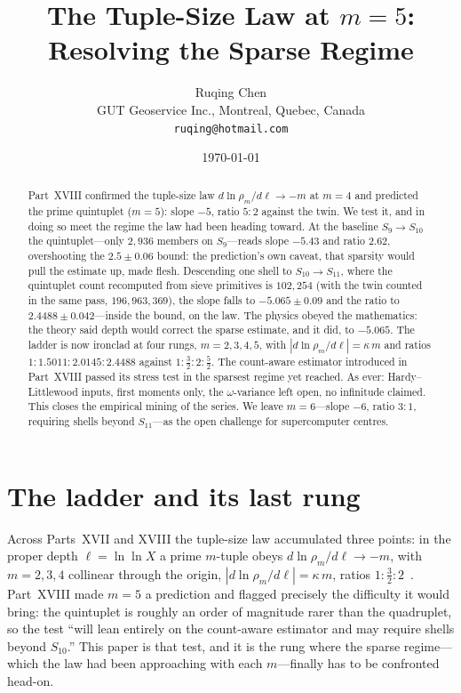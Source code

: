 \documentclass[11pt]{article}
\title{The Tuple-Size Law at $m=5$:\\
Resolving the Sparse Regime}
\author{Ruqing Chen\\
\small GUT Geoservice Inc., Montreal, Quebec, Canada\\
\small \texttt{ruqing@hotmail.com}}
\date{\today}
\begin{document}
\maketitle

\begin{abstract}
Part~XVIII confirmed the tuple-size law $d\ln\rho_m/d\ell\to-m$ at $m=4$ and
predicted the prime quintuplet ($m=5$): slope $-5$, ratio $5{:}2$ against the
twin. We test it, and in doing so meet the regime the law had been heading
toward. At the baseline $S_9\!\to\!S_{10}$ the quintuplet---only $2{,}936$
members on $S_9$---reads slope $-5.43$ and ratio $2.62$, overshooting the
$2.5\pm0.06$ bound: the prediction's own caveat, that sparsity would pull the
estimate up, made flesh. Descending one shell to $S_{10}\!\to\!S_{11}$, where the
quintuplet count recomputed from sieve primitives is $102{,}254$ (with the twin
counted in the same pass, $196{,}963{,}369$), the slope falls to $-5.065\pm0.09$
and the ratio to $2.4488\pm0.042$---inside the bound, on the law. The physics
obeyed the mathematics: the theory said depth would correct the sparse estimate,
and it did, to $-5.065$. The ladder is now ironclad at four rungs,
$m=2,3,4,5$, with $|d\ln\rho_m/d\ell|=\kappa\,m$ and ratios
$1:1.5011:2.0145:2.4488$ against $1:\tfrac32:2:\tfrac52$. The count-aware
estimator introduced in Part~XVIII passed its stress test in the sparsest regime
yet reached. As ever: Hardy--Littlewood inputs, first moments only, the
$\omega$-variance left open, no infinitude claimed. This closes the empirical
mining of the series. We leave $m=6$---slope $-6$, ratio $3{:}1$, requiring
shells beyond $S_{11}$---as the open challenge for supercomputer centres.
\end{abstract}

\section{The ladder and its last rung}

Across Parts~XVII and XVIII the tuple-size law accumulated three points: in the
proper depth $\ell=\ln\ln X$ a prime $m$-tuple obeys $d\ln\rho_m/d\ell\to-m$, with
$m=2,3,4$ collinear through the origin, $|d\ln\rho_m/d\ell|=\kappa\,m$, ratios
$1:\tfrac32:2$~\cite{ChenXVII,ChenXVIII}. Part~XVIII made $m=5$ a prediction and
flagged precisely the difficulty it would bring: the quintuplet is roughly an
order of magnitude rarer than the quadruplet, so the test ``will lean entirely on
the count-aware estimator and may require shells beyond $S_{10}$.'' This paper is
that test, and it is the rung where the sparse regime---which the law had been
approaching with each $m$---finally has to be confronted head-on.
\end{document}
